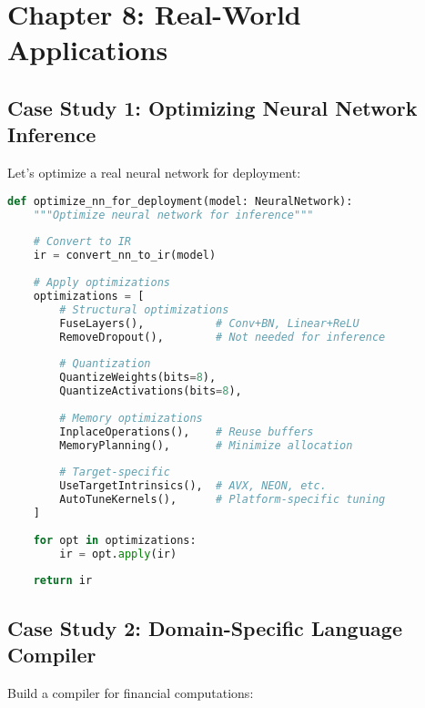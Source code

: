 \documentclass[11pt,a4paper]{article}
\begin{document}
\section{Chapter 8: Real-World Applications}

\subsection{Case Study 1: Optimizing Neural Network Inference}

Let's optimize a real neural network for deployment:

\begin{lstlisting}[language=Python, caption=Neural Network Optimization Pipeline]
def optimize_nn_for_deployment(model: NeuralNetwork):
    """Optimize neural network for inference"""
    
    # Convert to IR
    ir = convert_nn_to_ir(model)
    
    # Apply optimizations
    optimizations = [
        # Structural optimizations
        FuseLayers(),           # Conv+BN, Linear+ReLU
        RemoveDropout(),        # Not needed for inference
        
        # Quantization
        QuantizeWeights(bits=8),
        QuantizeActivations(bits=8),
        
        # Memory optimizations
        InplaceOperations(),    # Reuse buffers
        MemoryPlanning(),       # Minimize allocation
        
        # Target-specific
        UseTargetIntrinsics(),  # AVX, NEON, etc.
        AutoTuneKernels(),      # Platform-specific tuning
    ]
    
    for opt in optimizations:
        ir = opt.apply(ir)
    
    return ir
\end{lstlisting}

\subsection{Case Study 2: Domain-Specific Language Compiler}

Build a compiler for financial computations:
\end{document}
